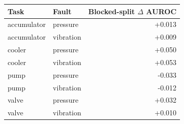 \begin{tabular}{llr}
\toprule
Task & Fault & Blocked-split $\Delta$ AUROC \\
\midrule
accumulator & pressure & +0.013 \\
accumulator & vibration & +0.009 \\
cooler & pressure & +0.050 \\
cooler & vibration & +0.053 \\
pump & pressure & -0.033 \\
pump & vibration & -0.012 \\
valve & pressure & +0.032 \\
valve & vibration & +0.010 \\
\bottomrule
\end{tabular}